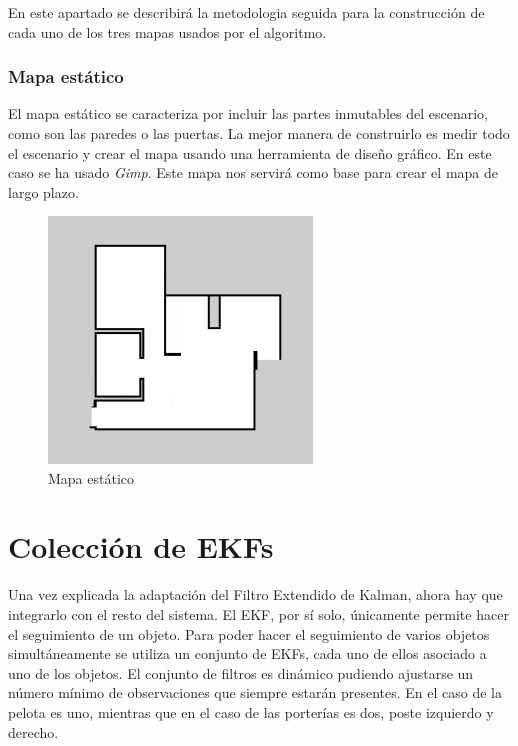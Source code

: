En este apartado se describirá la metodologia seguida para la construcción de cada uno de los tres mapas usados por el algoritmo.

\subsubsection{Mapa estático}
El mapa estático se caracteriza por incluir las partes inmutables del escenario, como son las paredes o las puertas. La mejor manera de construirlo es medir todo el escenario y crear el mapa usando una herramienta de diseño gráfico. En este caso se ha usado \textit{Gimp}.
Este mapa nos servirá como base para crear el mapa de largo plazo.

\begin{figure} [hbtp]
  \begin{center}
    \includegraphics[width=7cm]{img/cap4/mapaestatico}
  \end{center}
  \caption{Mapa estático}
  \label{fig:mapaestatico}
\end{figure}

\section{Colección de EKFs}
\label{sec:colecciondeekfs}

Una vez explicada la adaptación del Filtro Extendido de Kalman, ahora hay que integrarlo con el resto del sistema. El EKF, por sí solo, únicamente permite hacer el seguimiento de un objeto. Para poder hacer el seguimiento de varios objetos simultáneamente se utiliza un conjunto de EKFs, cada uno de ellos asociado a uno de los objetos. El conjunto de filtros es dinámico pudiendo ajustarse un número mínimo de observaciones que siempre estarán presentes. En el caso de la pelota es uno, mientras que en el caso de las porterías es dos, poste izquierdo y derecho.\\



